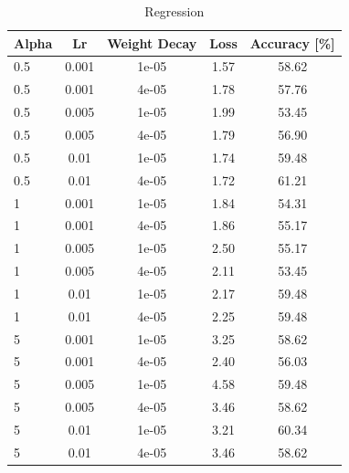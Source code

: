 \documentclass[10pt,twocolumn,letterpaper]{article}
\begin{document}
\begin{table}[h!]
	\begin{center}
		\begin{tabular}{lcc|cc}
			\textbf{Alpha} & \textbf{Lr} & \textbf{Weight Decay} & \textbf{Loss} & \textbf{Accuracy [\%]}\\
			\hline
			0.5&0.001&1e-05&1.57&58.62\\
			0.5&0.001&4e-05&1.78&57.76\\
			0.5&0.005&1e-05&1.99&53.45\\
			0.5&0.005&4e-05&1.79&56.90\\
			0.5&0.01&1e-05&1.74&59.48\\
			0.5&0.01&4e-05&1.72&61.21\\
			1&0.001&1e-05&1.84&54.31\\
			1&0.001&4e-05&1.86&55.17\\
			1&0.005&1e-05&2.50&55.17\\
			1&0.005&4e-05&2.11&53.45\\
			1&0.01&1e-05&2.17&59.48\\
			1&0.01&4e-05&2.25&59.48\\
			5&0.001&1e-05&3.25&58.62\\
			5&0.001&4e-05&2.40&56.03\\
			5&0.005&1e-05&4.58&59.48\\
			5&0.005&4e-05&3.46&58.62\\
			5&0.01&1e-05&3.21&60.34\\
			5&0.01&4e-05&3.46&58.62\\
			\hline
		\end{tabular}
	\end{center}	
	\caption{Regression}
\end{table}

{\small


}
\end{document}

